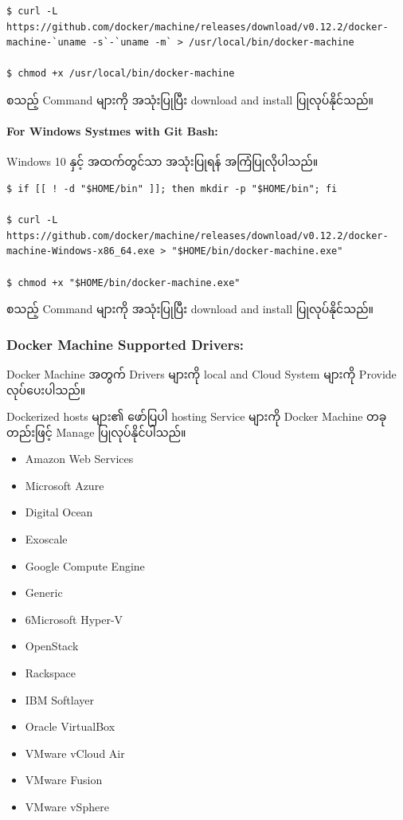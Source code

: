 \begin{verbatim}
$ curl -L https://github.com/docker/machine/releases/download/v0.12.2/docker-machine-`uname -s`-`uname -m` > /usr/local/bin/docker-machine

$ chmod +x /usr/local/bin/docker-machine
\end{verbatim}

စသည့် Command များကို အသုံးပြုပြီး download and install ပြုလုပ်နိုင်သည်။

\hypertarget{for-windows-systmes-with-git-bash}{%
\paragraph{For Windows Systmes with Git
Bash:}\label{for-windows-systmes-with-git-bash}}

Windows 10 နှင့် အထက်တွင်သာ အသုံးပြုရန် အကြံပြုလိုပါသည်။

\begin{verbatim}
$ if [[ ! -d "$HOME/bin" ]]; then mkdir -p "$HOME/bin"; fi

$ curl -L https://github.com/docker/machine/releases/download/v0.12.2/docker-machine-Windows-x86_64.exe > "$HOME/bin/docker-machine.exe"

$ chmod +x "$HOME/bin/docker-machine.exe"
\end{verbatim}

စသည့် Command များကို အသုံးပြုပြီး download and install ပြုလုပ်နိုင်သည်။

\hypertarget{docker-machine-supported-drivers}{%
\subsubsection{Docker Machine Supported
Drivers:}\label{docker-machine-supported-drivers}}

Docker Machine အတွက် Drivers များကို local and Cloud System များကို
Provide လုပ်ပေးပါသည်။

Dockerized hosts များ၏ ဖော်ပြပါ hosting Service များကို Docker Machine
တခုတည်းဖြင့် Manage ပြုလုပ်နိုင်ပါသည်။

\begin{itemize}
\tightlist
\item
  Amazon Web Services
\item
  Microsoft Azure
\item
  Digital Ocean
\item
  Exoscale
\item
  Google Compute Engine
\item
  Generic
\item
  6Microsoft Hyper-V
\item
  OpenStack
\item
  Rackspace
\item
  IBM Softlayer
\item
  Oracle VirtualBox
\item
  VMware vCloud Air
\item
  VMware Fusion
\item
  VMware vSphere
\end{itemize}

